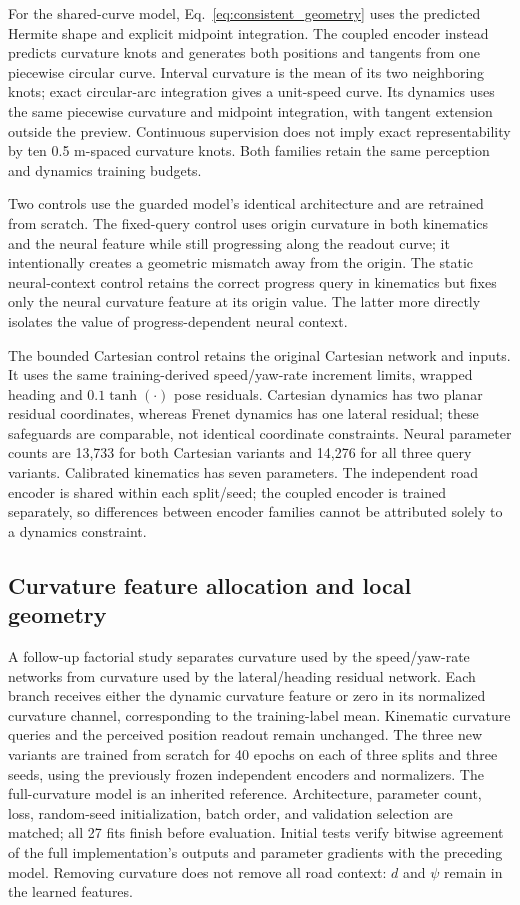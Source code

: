 \documentclass[preprint,12pt]{elsarticle}
\begin{document}
For the shared-curve model, Eq.~\ref{eq:consistent_geometry} uses the predicted
Hermite shape and explicit midpoint integration. The coupled encoder instead
predicts curvature knots and generates both positions and tangents from one
piecewise circular curve. Interval curvature is the mean of its two neighboring
knots; exact circular-arc integration gives a unit-speed curve. Its dynamics
uses the same piecewise curvature and midpoint integration, with tangent
extension outside the preview. Continuous supervision does not imply exact
representability by ten 0.5 m-spaced curvature knots. Both families retain the
same perception and dynamics training budgets.

Two controls use the guarded model's identical architecture and are retrained
from scratch. The fixed-query control uses origin curvature in both kinematics
and the neural feature while still progressing along the readout curve; it
intentionally creates a geometric mismatch away from the origin. The static
neural-context control retains the correct progress query in kinematics but
fixes only the neural curvature feature at its origin value. The latter more
directly isolates the value of progress-dependent neural context.

The bounded Cartesian control retains the original Cartesian network and
inputs. It uses the same training-derived speed/yaw-rate increment limits,
wrapped heading and $0.1\tanh(\cdot)$ pose residuals. Cartesian dynamics has two
planar residual coordinates, whereas Frenet dynamics has one lateral residual;
these safeguards are comparable, not identical coordinate constraints. Neural
parameter counts are 13,733 for both Cartesian variants and 14,276 for all three
query variants. Calibrated kinematics has seven parameters. The independent
road encoder is shared within each split/seed; the coupled encoder is trained
separately, so differences between encoder families cannot be attributed solely
to a dynamics constraint.

\subsection{Curvature feature allocation and local geometry}\label{sec:branch_factorial}
A follow-up factorial study separates curvature used by the speed/yaw-rate
networks from curvature used by the lateral/heading residual network. Each
branch receives either the dynamic curvature feature or zero in its normalized
curvature channel, corresponding to the training-label mean. Kinematic curvature
queries and the perceived position readout remain unchanged. The three new
variants are trained from scratch for 40 epochs on each of three splits and
three seeds, using the previously frozen independent encoders and normalizers.
The full-curvature model is an inherited reference. Architecture, parameter
count, loss, random-seed initialization, batch order, and validation selection
are matched; all 27 fits finish before evaluation. Initial tests verify bitwise
agreement of the full implementation's outputs and parameter gradients with
the preceding model. Removing curvature does not remove all road context:
$d$ and $\psi$ remain in the learned features.
\end{document}
